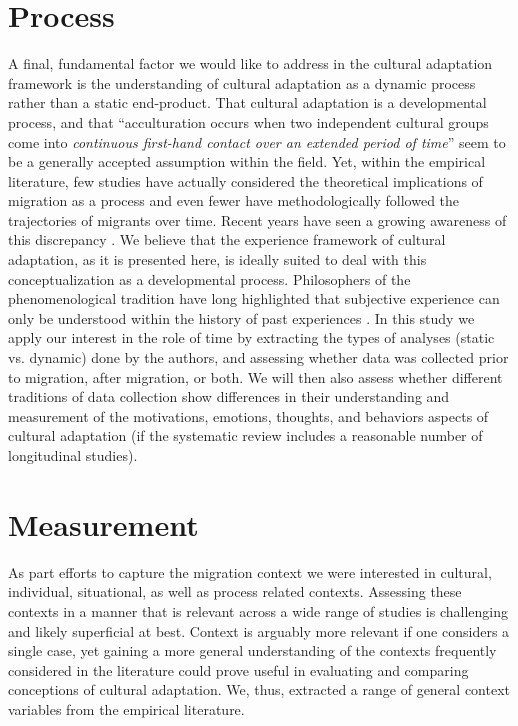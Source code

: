 \documentclass[man, 12pt, a4paper]{apa7}
\begin{document}
\section{Process} 
A final, fundamental factor we would like to address in the cultural adaptation framework is the understanding of cultural adaptation as a dynamic process rather than a static end-product. That cultural adaptation is a developmental process, and that ``acculturation occurs when two independent cultural groups come into \textit{continuous first-hand contact over an extended period of time}'' \citep[][186]{Berry1989} seem to be a generally accepted assumption within the field. Yet, within the empirical literature, few studies have actually considered the theoretical implications of migration as a process and even fewer have methodologically followed the trajectories of migrants over time. Recent years have seen a growing awareness of this discrepancy \citep[e.g.,][]{Brown2011, Ward2019}. We believe that the experience framework of cultural adaptation, as it is presented here, is ideally suited to deal with this conceptualization as a developmental process. Philosophers of the phenomenological tradition have long highlighted that subjective experience can only be understood within the history of past experiences \citep[e.g.,][; also see Figure \ref{fig:SupModelContext}]{Heidegger1867}. In this study we apply our interest in the role of time by extracting the types of analyses (static vs. dynamic) done by the authors, and assessing whether data was collected prior to migration, after migration, or both. We will then also assess whether different traditions of data collection show differences in their understanding and measurement of the motivations, emotions, thoughts, and behaviors aspects of cultural adaptation (if the systematic review includes a reasonable number of longitudinal studies).

\section{Measurement}
As part efforts to capture the migration context we were interested in cultural, individual, situational, as well as process related contexts. Assessing these contexts in a manner that is relevant across a wide range of studies is challenging and likely superficial at best. Context is arguably more relevant if one considers a single case, yet gaining a more general understanding of the contexts frequently considered in the literature could prove useful in evaluating and comparing conceptions of cultural adaptation. We, thus, extracted a range of general context variables from the empirical literature.
\end{document}
